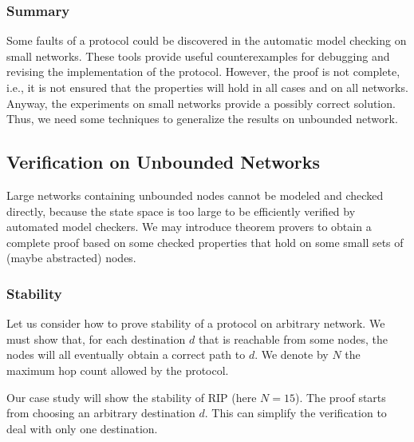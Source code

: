 \documentclass[a4paper,10pt,twocolumn]{article}
\begin{document}
\subsubsection{Summary}
Some faults of a protocol could be discovered in the automatic model checking on small networks. These tools provide useful counterexamples for debugging and revising the implementation of the protocol. However, the proof is not complete, i.e., it is not ensured that the properties will hold in all cases and on all networks. Anyway, the experiments on small networks provide a possibly correct solution. Thus, we need some techniques to generalize the results on unbounded network.

\subsection{Verification on Unbounded Networks}
Large networks containing unbounded nodes cannot be modeled and checked directly, because the state space is too large to be efficiently verified by automated model checkers. We may introduce theorem provers to obtain a complete proof based on some checked properties that hold on some small sets of (maybe abstracted) nodes.

\subsubsection{Stability}
Let us consider how to prove stability of a protocol on arbitrary network. We must show that, for each destination $d$ that is reachable from some nodes, the nodes will all eventually obtain a correct path to $d$. We denote by $N$ the maximum hop count allowed by the protocol.

Our case study will show the stability of RIP (here $N=15$). The proof starts from choosing an arbitrary destination $d$. This can simplify the verification to deal with only one destination.
\end{document}
